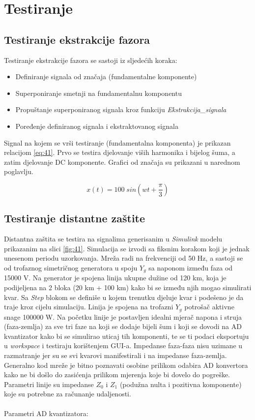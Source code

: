 \chapter{Testiranje}

\section{Testiranje ekstrakcije fazora}

Testiranje ekstrakcije fazora se sastoji iz sljedećih koraka:

\begin{itemize}
    \item Definiranje signala od značaja (fundamentalne komponente)
    \item Superponiranje smetnji na fundamentalnu komponentu
    \item Propuštanje superponiranog signala kroz funkciju \textit{Ekstrakcija\_signala}
    \item Poređenje definiranog signala i ekstraktovanog signala
\end{itemize}

Signal na kojem se vrši testiranje (fundamentalna komponenta) je prikazan relacijom \ref{eq:41}. Prvo se testira djelovanje viših harmonika i bijelog šuma, a zatim djelovanje DC komponente. Grafici od značaja su prikazani u narednom poglavlju. 

\begin{equation}
    x(t) = 100\;sin(wt + \frac{\pi}{3})
    \label{eq:41}
\end{equation}


\section{Testiranje distantne zaštite}

Distantna zaštita se testira na signalima generisanim u \textit{Simulink} modelu prikazanim na slici \ref{fig:41}. Simulacija se izvodi sa fiksnim korakom koji je jednak unesenom periodu uzorkovanja. Mreža radi na frekvenciji od 50 Hz, a sastoji se od trofaznog simetričnog generatora u spoju $Y_g$ sa naponom između faza od 15000 V. Na generator je spojena linija ukupne dužine od 120 km, koja je podijeljena na 2 bloka (20 km + 100 km) kako bi se između njih mogao simulirati kvar. Sa \textit{Step} blokom se definiše u kojem trenutku djeluje kvar i podešeno je da traje kroz cijelu simulaciju. Linija je spojena na trofazni $Y_g$ potrošač aktivne snage 100000 W. Na početku linije je postavljen idealni mjerač napona i struja (faza-zemlja) za sve tri faze na koji se dodaje bijeli šum i koji se dovodi na AD kvantizator kako bi se simulirao uticaj tih komponenti, te se ti podaci eksportuju u \textit{workspace} i testiraju korištenjem GUI-a. Impedanse faza-faza nisu uzimane u razmatranje jer su se svi kvarovi manifestirali i na impedanse faza-zemlja. Generalno kod mreže je bitno poznavati osobine prilikom odabira AD konvertora kako ne bi došlo do zasićenja prilikom mjerenja koje bi dovelo do pogreške. Parametri linije su impedanse $Z_0$ i $Z_1$ (podužna nulta i pozitivna komponente) koje su potrebne za računanje udaljenosti.
\\ \\ 
Parametri AD kvantizatora:

